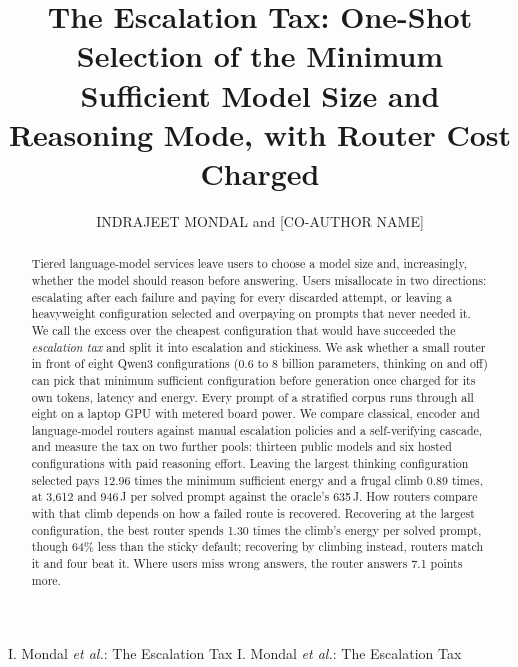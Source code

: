 \documentclass{ieeeaccess}
\begin{document}

\title{The Escalation Tax: One-Shot Selection of the Minimum Sufficient
Model Size and Reasoning Mode, with Router Cost Charged}

\author{\uppercase{Indrajeet Mondal} and
\uppercase{[Co-author Name]}}

\address[1]{[Department], [Institution], [City] [Postal Code], [Country]}

\markboth
{I. Mondal \textit{et al.}: The Escalation Tax}
{I. Mondal \textit{et al.}: The Escalation Tax}


\begin{abstract}
Tiered language-model services leave users to choose a model size and,
increasingly, whether the model should reason before answering. Users
misallocate in two directions: escalating after each failure and paying for
every discarded attempt, or leaving a heavyweight configuration selected and
overpaying on prompts that never needed it. We call the excess over the
cheapest configuration that would have succeeded the \emph{escalation tax}
and split it into escalation and stickiness. We ask whether a
small router in front of eight Qwen3 configurations (0.6 to 8 billion
parameters, thinking on and off) can pick that minimum sufficient
configuration before generation once charged for its own tokens, latency and
energy. Every prompt of a stratified corpus runs through all eight
on a laptop GPU with metered board power. We compare
classical, encoder and language-model routers against manual escalation
policies and a self-verifying cascade, and measure the tax on two further
pools: thirteen public models and six hosted configurations with paid
reasoning effort. Leaving the largest thinking configuration
selected pays 12.96 times the minimum sufficient energy and a frugal climb
0.89 times, at 3{,}612 and 946\,J per solved prompt against the oracle's
635\,J. How routers compare with that climb depends on how a failed route is
recovered. Recovering at the largest configuration, the best router spends
1.30 times the climb's energy per solved prompt, though 64\% less than the
sticky default; recovering by climbing instead,
routers match it and four beat it. Where users miss wrong answers, the
router answers 7.1 points more.
\end{abstract}
\end{document}
